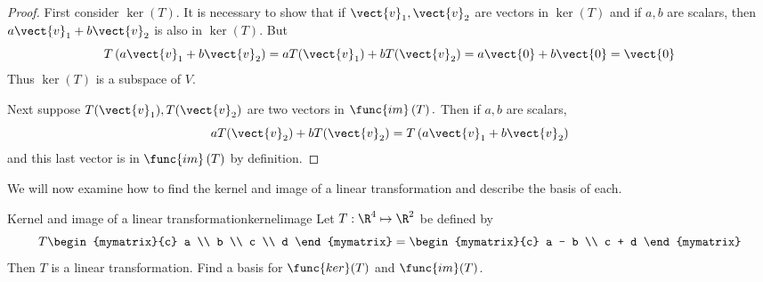 \begin{proof}
First consider $\ker \left( T\right) .$ It is necessary to
show that if $\vect{v}_{1},\vect{v}_{2}$ are vectors in $\ker \left( T\right) $
and if $a,b$ are scalars, then $a\vect{v}_{1}+b\vect{v}_{2}$ is also in $\ker
\left( T\right) .$ But 
\begin{equation*}
T\left( a\vect{v}_{1}+b\vect{v}_{2}\right) =aT(\vect{v}_{1})+bT(\vect{v}_{2})=a\vect{0}+b\vect{0}=\vect{0}
\end{equation*}
Thus $\ker \left( T\right) $ is a subspace of $V$.

Next suppose $T(\vect{v}_{1}),T(\vect{v}_{2})$ are two vectors in $\func{im}\left(
T\right) .$ Then if $a,b$ are scalars, 
\begin{equation*}
aT(\vect{v}_{2})+bT(\vect{v}_{2})=T\left( a\vect{v}_{1}+b\vect{v}_{2}\right)
\end{equation*}
and this last vector is in $\func{im}\left( T\right) $ by definition. 
\end{proof}

We will now examine how to find the kernel and image of a linear transformation and describe the basis of each. 

\begin{example}{Kernel and image of a linear transformation}{kernelimage}
Let $T: \R^4 \mapsto \R^2$ be defined by
\[
T \begin{mymatrix}{c}
a \\
b \\
c \\
d
\end{mymatrix} = 
\begin{mymatrix}{c}
a - b \\ 
c + d
\end{mymatrix}
\]
Then $T$ is a linear transformation. Find a basis for $\func{ker}(T)$ and $\func{im}(T)$. 
\end{example}

